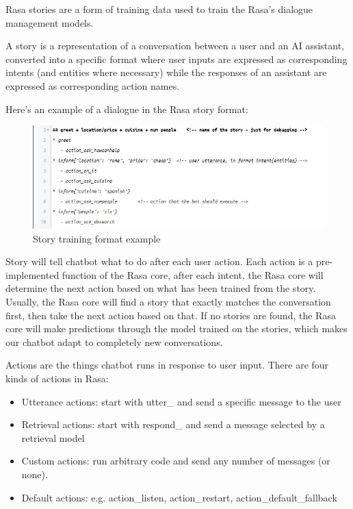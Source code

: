
Rasa stories are a form of training data used to train the Rasa’s dialogue management models.

A story is a representation of a conversation between a user and an AI assistant, converted into a specific format where user inputs are expressed as corresponding intents (and entities where necessary) while the responses of an assistant are expressed as corresponding action names.

Here’s an example of a dialogue in the Rasa story format:

\begin{figure}[h]
    \label{fig:storyexample}
    \centering
    \includegraphics[width=1\textwidth]{Picture/storyexample.jpg}
    \caption{Story training format example}
\end{figure}

Story will tell chatbot what to do after each user action. Each action is a pre-implemented function of the Rasa core, after each intent, the Rasa core will determine the next action based on what has been trained from the story.
Usually, the Rasa core will find a story that exactly matches the conversation first, then take the next action based on that. If no stories are found, the Rasa core will make predictions through the model trained on the stories, which makes our chatbot adapt to completely new conversations.


Actions are the things chatbot runs in response to user input. There are four kinds of actions in Rasa:


\begin{itemize}
\item Utterance actions: start with utter\_ and send a specific message to the user
\item Retrieval actions: start with respond\_ and send a message selected by a retrieval model
\item Custom actions: run arbitrary code and send any number of messages (or none).
\item Default actions: e.g. action\_listen, action\_restart, action\_default\_fallback
\end{itemize}

